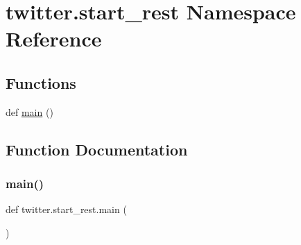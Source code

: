 \hypertarget{namespacetwitter_1_1start__rest}{}\section{twitter.\+start\+\_\+rest Namespace Reference}
\label{namespacetwitter_1_1start__rest}
\subsection*{Functions}
\begin{DoxyCompactItemize}
\item 
def \hyperlink{namespacetwitter_1_1start__rest_a6af73c7b1e2468c2dbc9266d22cbf029}{main} ()
\end{DoxyCompactItemize}


\subsection{Function Documentation}
\mbox{\label{namespacetwitter_1_1start__rest_a6af73c7b1e2468c2dbc9266d22cbf029}} 
\subsubsection{\texorpdfstring{main()}{main()}}
{\footnotesize\ttfamily def twitter.\+start\+\_\+rest.\+main (\begin{DoxyParamCaption}{ }\end{DoxyParamCaption})}

